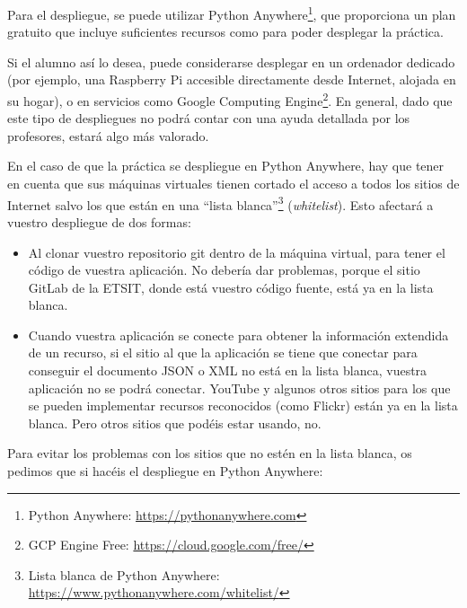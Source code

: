 Para el despliegue, se puede utilizar Python Anywhere\footnote{Python Anywhere: \url{https://pythonanywhere.com}}, que proporciona un plan gratuito que incluye suficientes recursos como para poder desplegar la práctica.

Si el alumno así lo desea, puede considerarse desplegar en un ordenador dedicado (por ejemplo, una Raspberry Pi accesible directamente desde Internet, alojada en su hogar), o en servicios como Google Computing Engine\footnote{GCP Engine Free: \url{https://cloud.google.com/free/}}. En general, dado que este tipo de despliegues no podrá contar con una ayuda detallada por los profesores, estará algo más valorado.

En el caso de que la práctica se despliegue en Python Anywhere, hay que tener en cuenta que sus máquinas virtuales tienen cortado el acceso a todos los sitios de Internet salvo los que están en una ``lista blanca''\footnote{Lista blanca de Python Anywhere: \url{https://www.pythonanywhere.com/whitelist/}} (\emph{whitelist}). Esto afectará a vuestro despliegue de dos formas:

\begin{itemize}
\item Al clonar vuestro repositorio git dentro de la máquina virtual, para tener el código de vuestra aplicación. No debería dar problemas, porque el sitio GitLab de la ETSIT, donde está vuestro código fuente, está ya en la lista blanca.
\item Cuando vuestra aplicación se conecte para obtener la información extendida de un recurso, si el sitio al que la aplicación se tiene que conectar para conseguir el documento JSON o XML no está en la lista blanca, vuestra aplicación no se podrá conectar. YouTube y algunos otros sitios para los que se pueden implementar recursos reconocidos (como Flickr) están ya en la lista blanca. Pero otros sitios que podéis estar usando, no.
\end{itemize}

Para evitar los problemas con los sitios que no estén en la lista blanca, os pedimos que si hacéis el despliegue en Python Anywhere:

